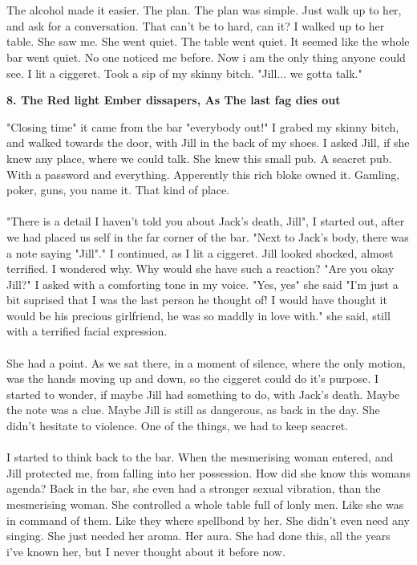 \documentclass[]{article}
\begin{document}
	\\ \\
	The alcohol made it easier. The plan. The plan was simple. Just walk up to her, and ask for a conversation. That can't be to hard, can it? I walked up to her table. She saw me. She went quiet. The table went quiet. It seemed like the whole bar went quiet. No one noticed me before. Now i am the only thing anyone could see. I lit a ciggeret. Took a sip of my skinny bitch. "Jill... we gotta talk."
	
	\newpage
	
	\begin{center}
		\large\textbf{8. The Red light Ember dissapers, \newline As The last fag dies out}
	\end{center}
	
	"Closing time" it came from the bar "everybody out!" I grabed my skinny bitch, and walked towards the door, with Jill in the back of my shoes. I asked Jill, if she knew any place, where we could talk. She knew this small pub. A seacret pub. With a password and everything. Apperently this rich bloke owned it. Gamling, poker, guns, you name it. That kind of place. 
	\\ \\
	"There is a detail I haven't told you about Jack's death, Jill", I started out, after we had placed us self in the far corner of the bar. "Next to Jack's body, there was a note saying "Jill"." I continued, as I lit a ciggeret. Jill looked shocked, almost terrified. I wondered why. Why would she have such a reaction? "Are you okay Jill?" I asked with a comforting tone in my voice. "Yes, yes" she said "I'm just a bit suprised that I was the last person he thought of! I would have thought it would be his precious girlfriend, he was so maddly in love with." she said, still with a terrified facial expression.
	\\ \\
	She had a point. As we sat there, in a moment of silence, where the only motion, was the hands moving up and down, so the ciggeret could do it's purpose. I started to wonder, if maybe Jill had something to do, with Jack's death. Maybe the note was a clue. Maybe Jill is still as dangerous, as back in the day. She didn't hesitate to violence. One of the things, we had to keep seacret.
	\\ \\
	I started to think back to the bar. When the mesmerising woman entered, and Jill protected me, from falling into her possession. How did she know this womans agenda? Back in the bar, she even had a stronger sexual vibration, than the mesmerising woman. She controlled a whole table full of lonly men. Like she was in command of them. Like they where spellbond by her. She didn't even need any singing. She just needed her aroma. Her aura. She had done this, all the years i've known her, but I never thought about it before now.
\end{document}
